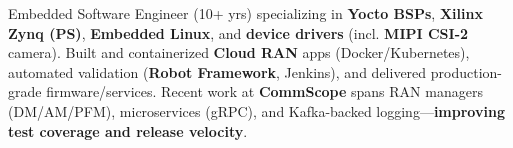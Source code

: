 
\begin{flushleft}
Embedded Software Engineer (10+ yrs) specializing in \textbf{Yocto BSPs}, \textbf{Xilinx Zynq (PS)}, 
\textbf{Embedded Linux}, and \textbf{device drivers} (incl. \textbf{MIPI CSI-2} camera). Built and containerized \textbf{Cloud RAN} 
apps (Docker/Kubernetes), automated validation (\textbf{Robot Framework}, Jenkins), and delivered 
production-grade firmware/services. Recent work at \textbf{CommScope} spans 
RAN managers (DM/AM/PFM), microservices (gRPC), and Kafka-backed logging—\textbf{improving test coverage 
and release velocity}.
\end{flushleft}